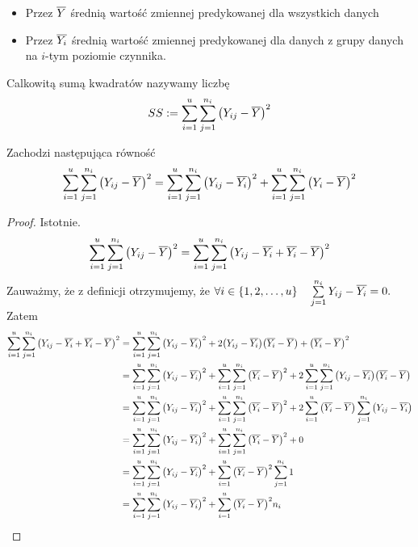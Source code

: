 \documentclass[10pt,a4paper]{book}
\begin{document}
\begin{itemize}
\item Przez $\overline{Y}$ średnią wartość zmiennej predykowanej dla wszystkich danych
\item Przez $\overline{Y_i}$ średnią wartość zmiennej predykowanej dla danych z grupy danych na $i$-tym poziomie czynnika.
\end{itemize}

\begin{definition}
Calkowitą sumą kwadratów nazywamy liczbę
$$
SS := \sum_{i=1}^{u} \sum_{j=1}^{n_i} \bracket{Y_{ij} - \mean{Y}}^2
$$
\end{definition}

\begin{lemma}
Zachodzi następująca równość
$$
\sum_{i=1}^{u} \sum_{j=1}^{n_i} \bracket{Y_{ij} - \mean{Y}}^2 = \sum_{i=1}^{u} \sum_{j=1}^{n_i} \bracket{Y_{ij} - \mean{Y_i}}^2 +
\sum_{i=1}^{u} \sum_{j=1}^{n_i} \bracket{Y_{i} - \mean{Y}}^2
$$
\end{lemma}

\begin{proof}
\tiny
Istotnie. 
$$
\sum_{i=1}^{u} \sum_{j=1}^{n_i} \bracket{Y_{ij} - \mean{Y}}^2 =
\sum_{i=1}^{u} \sum_{j=1}^{n_i} \bracket{Y_{ij} - \mean{Y_i} + 
\mean{Y_i} - \mean{Y}}^2
$$
Zauważmy, że z definicji otrzymujemy, że 
$
\forall i \in \set{1, 2, \ldots, u} \quad \sum_{j=1}^{n_i} Y_{ij} - \mean{Y_i} = 0.
$
Zatem
\begin{align*}
\sum_{i=1}^{u} \sum_{j=1}^{n_i} \bracket{Y_{ij} - \mean{Y_i} + 
\mean{Y_i} - \mean{Y}}^2 & = \sum_{i=1}^{u} \sum_{j=1}^{n_i} \bracket{Y_{ij} - \mean{Y_i}}^2 + 
2 \bracket{Y_{ij} - \mean{Y_i}} \bracket{\mean{Y_i} - \mean{Y}} +
\bracket{\mean{Y_i} - \mean{Y}}^2 \\
& = \sum_{i=1}^{u} \sum_{j=1}^{n_i} \bracket{Y_{ij} - \mean{Y_i}}^2 + 
\sum_{i=1}^{u} \sum_{j=1}^{n_i} \bracket{\mean{Y_i} - \mean{Y}}^2 +
2 \sum_{i=1}^{u} \sum_{j=1}^{n_i} \bracket{Y_{ij} - \mean{Y_i}} \bracket{\mean{Y_i} - \mean{Y}} \\
& = \sum_{i=1}^{u} \sum_{j=1}^{n_i} \bracket{Y_{ij} - \mean{Y_i}}^2 + 
\sum_{i=1}^{u} \sum_{j=1}^{n_i} \bracket{\mean{Y_i} - \mean{Y}}^2 +
2 \sum_{i=1}^{u} \bracket{\mean{Y_i} - \mean{Y}} \sum_{j=1}^{n_i} \bracket{Y_{ij} - \mean{Y_i}}  \\
& = \sum_{i=1}^{u} \sum_{j=1}^{n_i} \bracket{Y_{ij} - \mean{Y_i}}^2 + 
\sum_{i=1}^{u} \sum_{j=1}^{n_i} \bracket{\mean{Y_i} - \mean{Y}}^2 +
0 \\
& = \sum_{i=1}^{u} \sum_{j=1}^{n_i} \bracket{Y_{ij} - \mean{Y_i}}^2 + 
\sum_{i=1}^{u} \bracket{\mean{Y_i} - \mean{Y}}^2 \sum_{j=1}^{n_i} 1  \\
& = \sum_{i=1}^{u} \sum_{j=1}^{n_i} \bracket{Y_{ij} - \mean{Y_i}}^2 + 
\sum_{i=1}^{u} \bracket{\mean{Y_i} - \mean{Y}}^2 n_i 
\end{align*}
\end{proof}
\end{document}
